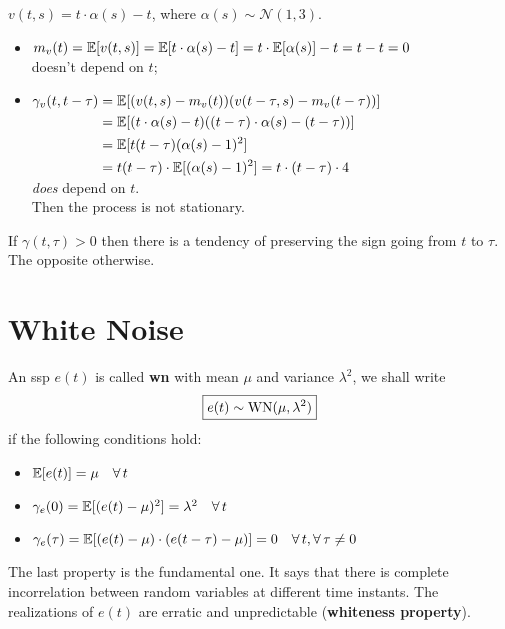 \begin{exa}
$\boxed{v(t, s)=t \cdot \alpha(s)-t}$, where $\alpha(s) \sim \mathcal{N}(1,3)$.
\begin{itemize}
	\item $m_{v}(t)=\mathbb{E}[v(t, s)]=\mathbb{E}[t \cdot \alpha(s)-t]=t \cdot \mathbb{E}[\alpha(s)]-t=t-t=0$\\
	doesn't depend on $t$;
	\item $\begin{aligned}[t]
		\gamma_{v}(t, t-\tau)&=\mathbb{E}[(v(t, s)-m_{v}(t))(v(t-\tau, s)-m_{v}(t-\tau))]\\
	&=\mathbb{E}[(t \cdot \alpha(s)-t)((t-\tau) \cdot \alpha(s)-(t-\tau))]\\
	&=\mathbb{E}[t(t-\tau)(\alpha(s)-1)^{2}]\\
	&=t(t-\tau) \cdot \mathbb{E}[(\alpha(s)-1)^{2}]=t \cdot(t-\tau) \cdot 4
	\end{aligned}$\\
	\emph{does} depend on $t$.\\
	Then the process is not stationary.
\end{itemize}
\end{exa}

\begin{rem}
If $\gamma(t, \tau)>0$ then there is a tendency of preserving the sign going from $t$ to $\tau $. The opposite otherwise.
\end{rem}
\section{White Noise}

\begin{defn}
	An \gls{ssp} $e(t)$ is called \textbf{\gls{wn}} with mean $\mu$ and variance $\lambda^{2}$, we shall write
	\[
		\boxed{e(t) \sim \operatorname{WN}(\mu, \lambda^{2})}
	\]
	if the following conditions hold:
	\begin{itemize}
		\item $\E[e(t)]=\mu \quad \forall t$
		\item $\gamma_{e}(0)=\E[(e(t)-\mu)^{2}]=\lambda^{2} \quad \forall t$
		\item $\gamma_{e}(\tau)=\E[(e(t)-\mu) \cdot(e(t-\tau)-\mu)]=0 \quad \forall t, \forall \tau \neq 0$
	\end{itemize}	
\end{defn}
The last property is the fundamental one. It says that there is complete incorrelation between random variables at different time instants. The realizations of $e(t)$ are erratic and unpredictable (\textbf{whiteness property}).

